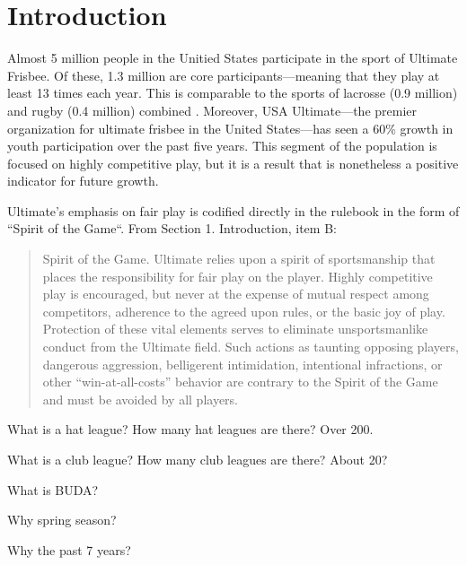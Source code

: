 \section{Introduction}

Almost 5 million people in the Unitied States participate in the sport of Ultimate Frisbee.  Of these, 1.3 million are core participants---meaning that they play at least 13 times each year.  This is comparable to the sports of lacrosse (0.9 million) and rugby (0.4 million) combined \cite{sfia_2016}. Moreover, USA Ultimate---the premier organization for ultimate frisbee in the United States---has seen a 60\% growth in youth participation over the past five years.  This segment of the population is focused on highly competitive play, but it is a result that is nonetheless a positive indicator for future growth.

Ultimate's emphasis on fair play is codified directly in the rulebook in the form of ``Spirit of the Game``.  From Section 1. Introduction, item B:

\begin{quote} Spirit of the Game. Ultimate relies upon a spirit of sportsmanship that places the responsibility for fair play on the player. Highly competitive play is encouraged, but never at the expense of mutual respect among competitors, adherence to the agreed upon rules, or the basic joy of play. Protection of these vital elements serves to eliminate unsportsmanlike conduct from the Ultimate field. Such actions as taunting opposing players, dangerous aggression, belligerent intimidation, intentional infractions, or other ``win-at-all-costs'' behavior are contrary to the Spirit of the Game and must be avoided by all players.
\end{quote}

What is a hat league?  How many hat leagues are there? Over 200.

What is a club league?  How many club leagues are there? About 20?

What is BUDA?

Why spring season?

Why the past 7 years?